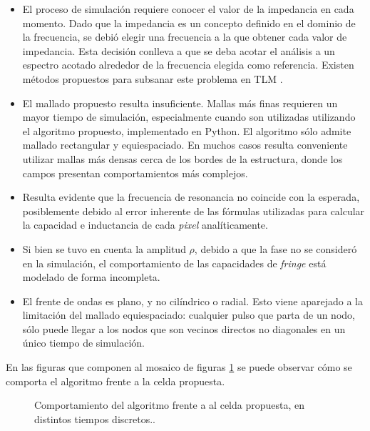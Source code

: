 \begin{itemize}
	\item El proceso de simulación requiere conocer el valor de la impedancia en cada momento. Dado que la impedancia es un concepto definido en el dominio de la frecuencia, se debió elegir una frecuencia a la que obtener cada valor de impedancia. Esta decisión conlleva a que se deba acotar el análisis a un espectro acotado alrededor de la frecuencia elegida como referencia. Existen métodos propuestos para subsanar este problema en TLM \cite{Saguet:NumericalAnalysisInElectromagnetics}.
	\item El mallado propuesto resulta insuficiente. Mallas más finas requieren un mayor tiempo de simulación, especialmente cuando son utilizadas utilizando el algoritmo propuesto, implementado en Python. El algoritmo sólo admite mallado rectangular y equiespaciado. En muchos casos resulta conveniente utilizar mallas más densas cerca de los bordes de la estructura, donde los campos presentan comportamientos más complejos.
	\item Resulta evidente que la frecuencia de resonancia no coincide con la esperada, posiblemente debido al error inherente de las fórmulas utilizadas para calcular la capacidad e inductancia de cada \textit{pixel} analíticamente.
	\item Si bien se tuvo en cuenta la amplitud $\rho$, debido a que la fase no se consideró en la simulación, el comportamiento de las capacidades de \textit{fringe} está modelado de forma incompleta.
	\item El frente de ondas es plano, y no cilíndrico o radial. Esto viene aparejado a la limitación del mallado equiespaciado: cualquier pulso que parta de un nodo, sólo puede llegar a los nodos que son vecinos directos no diagonales en un único tiempo de simulación.
\end{itemize}

En las figuras que componen al mosaico de figuras \ref{fig:progresion_tiempo_tlm} se puede observar cómo se comporta el algoritmo frente a la celda propuesta.

\begin{figure}[htp]
	\centering 
	\caption{Comportamiento del algoritmo frente a al celda propuesta, en distintos tiempos discretos..}
	\label{fig:progresion_tiempo_tlm}
\end{figure}

